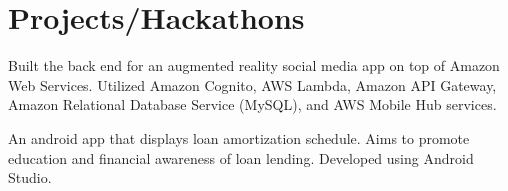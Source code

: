 \documentclass[]{hieudo-build}
\begin{document}
\begin{minipage}[t]{0.65\textwidth}
\section{Projects/Hackathons}
Built the back end for an augmented reality social media app on top of Amazon Web Services. Utilized Amazon Cognito, AWS Lambda, Amazon API Gateway, 
Amazon Relational Database Service (MySQL), and AWS Mobile Hub services.

\sectionsep 

\descript{}
An android app that displays loan amortization schedule. Aims to promote education and financial awareness of loan lending. Developed using Android Studio.
\sectionsep 


\end{minipage} 
\end{document}

